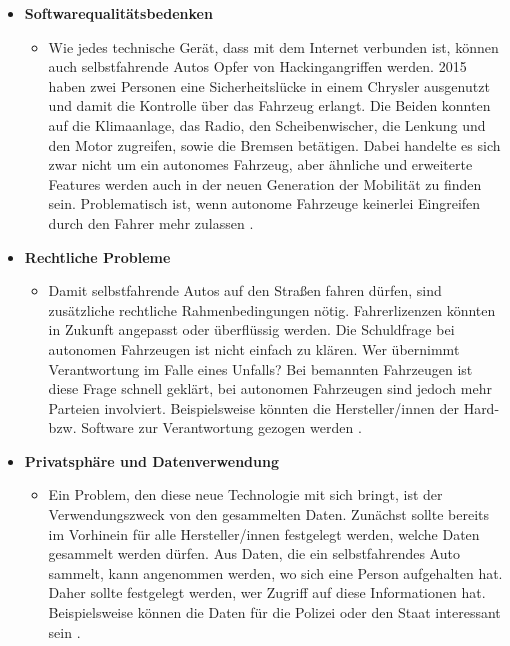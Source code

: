 \documentclass{sigchi}
\begin{document}
\begin{itemize}
    \item \textbf{Softwarequalitätsbedenken}
        \begin{itemize}
            \item Wie jedes technische Gerät, dass mit dem Internet verbunden ist, können auch selbstfahrende Autos Opfer von Hackingangriffen werden. 2015 haben zwei Personen eine Sicherheitslücke in einem Chrysler ausgenutzt und damit die Kontrolle über das Fahrzeug erlangt. Die Beiden konnten auf die Klimaanlage, das Radio, den Scheibenwischer, die Lenkung und den Motor zugreifen, sowie die Bremsen betätigen. Dabei handelte es sich zwar nicht um ein autonomes Fahrzeug, aber ähnliche und erweiterte Features werden auch in der neuen Generation der Mobilität zu finden sein. Problematisch ist, wenn autonome Fahrzeuge keinerlei Eingreifen durch den Fahrer mehr zulassen \cite{privacy-and-security-issues:2019}.
    \end{itemize}
    \item \textbf{Rechtliche Probleme}
        \begin{itemize}
            \item Damit selbstfahrende Autos auf den Straßen fahren dürfen, sind zusätzliche rechtliche Rahmenbedingungen nötig. Fahrerlizenzen könnten in Zukunft angepasst oder überflüssig werden. Die Schuldfrage bei autonomen Fahrzeugen ist nicht einfach zu klären. Wer übernimmt Verantwortung im Falle eines Unfalls? Bei bemannten Fahrzeugen ist diese Frage schnell geklärt, bei autonomen Fahrzeugen sind jedoch mehr Parteien involviert. Beispielsweise könnten die Hersteller/innen der Hard- bzw. Software zur Verantwortung gezogen werden \cite{itf:2015}.
        \end{itemize}
    \item \textbf{Privatsphäre und Datenverwendung}
        \begin{itemize}
            \item Ein Problem, den diese neue Technologie mit sich bringt, ist der Verwendungszweck von den gesammelten Daten. Zunächst sollte bereits im Vorhinein für alle Hersteller/innen festgelegt werden, welche Daten gesammelt werden dürfen. Aus Daten, die ein selbstfahrendes Auto sammelt, kann angenommen werden, wo sich eine Person aufgehalten hat. Daher sollte festgelegt werden, wer Zugriff auf diese Informationen hat. Beispielsweise können die Daten für die Polizei oder den Staat interessant sein \cite{glancy-privacy:2012}.
        \end{itemize}
\end{itemize}
\end{document}
